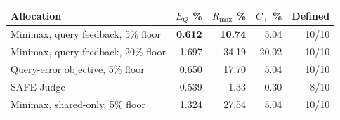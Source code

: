 \begin{tabular}{@{}lrrrr@{}}
\toprule
Allocation & $E_Q$ \% & $R_{\max}$ \% & $C_+$ \% & Defined \\
\midrule
Minimax, query feedback, 5\% floor & \textbf{0.612} & \textbf{10.74} & 5.04 & 10/10 \\
Minimax, query feedback, 20\% floor & 1.697 & 34.19 & 20.02 & 10/10 \\
Query-error objective, 5\% floor & 0.650 & 17.70 & 5.04 & 10/10 \\
SAFE-Judge & 0.539 & 1.33 & 0.30 & 8/10 \\
Minimax, shared-only, 5\% floor & 1.324 & 27.54 & 5.04 & 10/10 \\
\bottomrule
\end{tabular}
